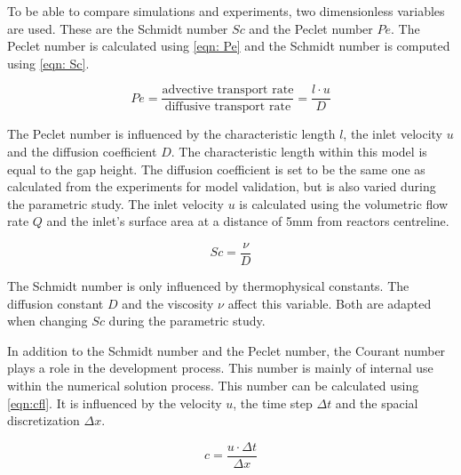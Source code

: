 \documentclass[../thesis.tex]{subfiles}
\begin{document}
To be able to compare simulations and experiments, two dimensionless variables are used. These are the Schmidt number $Sc$ and the Peclet number $Pe$. The Peclet number is calculated using \autoref{eqn: Pe} and the Schmidt number is computed using \autoref{eqn: Sc}.

\begin{equation}
	\label{eqn: Pe}
	Pe = \dfrac{\text{advective transport rate}}{\text{diffusive transport rate}} =\dfrac{l \cdot u}{D}
\end{equation}

The Peclet number is influenced by the characteristic length $l$, the inlet velocity $u$ and the diffusion coefficient $D$. The characteristic length within this model is equal to the gap height. The diffusion coefficient is set to be the same one as calculated from the experiments for model validation, but is also varied during the parametric study. The inlet velocity $u$ is calculated using the volumetric flow rate $Q$ and the inlet's surface area at a distance of 5mm from reactors centreline. 

\begin{equation}
	\label{eqn: Sc}
	Sc = \dfrac{\nu}{D}
\end{equation}

The Schmidt number is only influenced by thermophysical constants. The diffusion constant $D$ and the viscosity $\nu$ affect this variable. Both are adapted when changing $Sc$ during the parametric study.

In addition to the Schmidt number and the Peclet number, the Courant number plays a role in the development process. This number is mainly of internal use within the numerical solution process. This number can be calculated using \autoref{eqn:cfl}. It is influenced by the velocity $u$, the time step $ \Delta t$ and the spacial discretization $\Delta x$.

\begin{equation}
	\label{eqn:cfl}
	c = \dfrac{u \cdot \Delta t}{\Delta x}
\end{equation}
\end{document}
